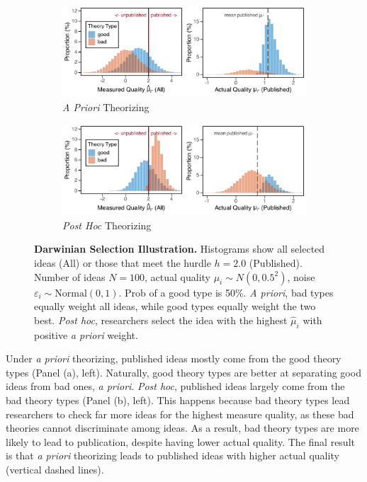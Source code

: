 \documentclass[12pt,english]{article}
\theoremstyle{plain}
\theoremstyle{plain}
\begin{document}
\begin{figure}[h]
    \def\tempwidth{1.0\textwidth}

    \centering
    \begin{subfigure}[b]{\textwidth}
        \centering
        \caption{\emph{A Priori} Theorizing}
        \includegraphics[width=\tempwidth]{exhibits/many-par0-ap.pdf}
    \end{subfigure}
    
    \vspace{1em}
    
    \begin{subfigure}[b]{\textwidth}
        \centering
        \caption{\emph{Post Hoc} Theorizing}
        \includegraphics[width=\tempwidth]{exhibits/many-par0-ph.pdf}
    \end{subfigure}
    \caption{
        \textbf{Darwinian Selection Illustration.} Histograms show all selected ideas (All) or those that meet the hurdle $h=2.0$ (Published). Number of ideas $N=100$, actual quality $\mu_i \sim N(0, 0.5^2)$, noise $\varepsilon_i \sim \text{Normal}(0, 1)$. Prob of a good type is 50\%. \emph{A priori}, bad types equally weight all ideas, while good types equally weight the two best. \emph{Post hoc}, researchers select the idea with the highest $\hat{\mu}_i$ with positive \emph{a priori} weight.  
    }
    \label{fig:darwinian_selection}
\end{figure}

Under \emph{a priori} theorizing, published ideas mostly come from the good theory types (Panel (a), left). Naturally, good theory types are better at separating good ideas from bad ones, \emph{a priori}. \emph{Post hoc}, published ideas largely come from the bad theory types (Panel (b), left). This happens because bad theory types lead researchers to check far more ideas for the highest measure quality, as these bad theories cannot discriminate among ideas. As a result, bad theory types are more likely to lead to publication, despite having lower actual quality. The final result is that \emph{a priori} theorizing leads to published ideas with higher actual quality (vertical dashed lines).
\end{document}
